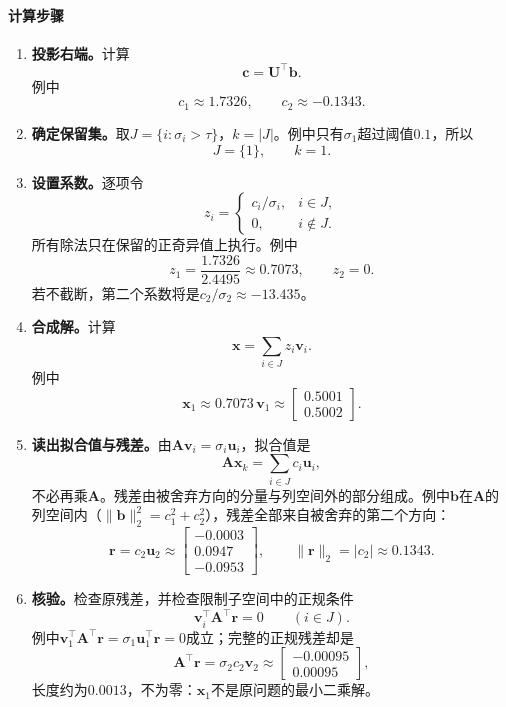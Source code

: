 \paragraph{计算步骤}
\begin{enumerate}
 \item \textbf{投影右端。}计算
 \[
  \bm c=\bm U^\top\bm b .
 \]
 例中
 \[
  c_1\approx1.7326,\qquad c_2\approx-0.1343 .
 \]

 \item \textbf{确定保留集。}取$J=\{i:\sigma_i>\tau\}$，$k=|J|$。例中只有$\sigma_1$超过阈值$0.1$，所以
 \[
  J=\{1\},\qquad k=1 .
 \]

 \item \textbf{设置系数。}逐项令
 \begin{equation}
  z_i=\begin{cases}c_i/\sigma_i,& i\in J,\\ 0,& i\notin J .\end{cases}
  \label{eq:ls-tsvd-coefficients}
 \end{equation}
 所有除法只在保留的正奇异值上执行。例中
 \[
  z_1=\frac{1.7326}{2.4495}\approx0.7073,\qquad z_2=0 .
 \]
 若不截断，第二个系数将是$c_2/\sigma_2\approx-13.435$。

 \item \textbf{合成解。}计算
 \[
  \bm x=\sum_{i\in J}z_i\bm v_i .
 \]
 例中
 \[
  \bm x_1\approx0.7073\,\bm v_1\approx\begin{bmatrix}0.5001\\0.5002\end{bmatrix}.
 \]

 \item \textbf{读出拟合值与残差。}由$\bm A\bm v_i=\sigma_i\bm u_i$，拟合值是
 \begin{equation}
  \bm A\bm x_k=\sum_{i\in J}c_i\bm u_i ,
  \label{eq:ls-tsvd-fitted-values}
 \end{equation}
 不必再乘$\bm A$。残差由被舍弃方向的分量与列空间外的部分组成。例中$\bm b$在$\bm A$的列空间内（$\lVert\bm b\rVert_2^2=c_1^2+c_2^2$），残差全部来自被舍弃的第二个方向：
 \[
  \bm r=c_2\bm u_2\approx\begin{bmatrix}-0.0003\\0.0947\\-0.0953\end{bmatrix},\qquad
  \lVert\bm r\rVert_2=|c_2|\approx0.1343 .
 \]

 \item \textbf{核验。}检查原残差，并检查限制子空间中的正规条件
 \begin{equation}
  \bm v_i^\top\bm A^\top\bm r=0\qquad(i\in J).
  \label{eq:ls-tsvd-restricted-normal-condition}
 \end{equation}
 例中$\bm v_1^\top\bm A^\top\bm r=\sigma_1\bm u_1^\top\bm r=0$成立；完整的正规残差却是
 \[
  \bm A^\top\bm r=\sigma_2c_2\bm v_2\approx\begin{bmatrix}-0.00095\\0.00095\end{bmatrix},
 \]
 长度约为$0.0013$，不为零：$\bm x_1$不是原问题的最小二乘解。
\end{enumerate}

